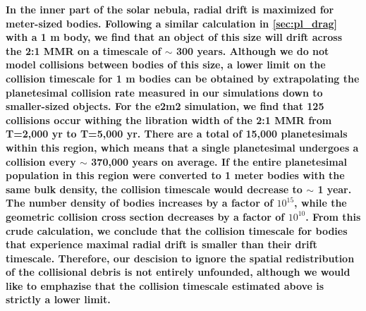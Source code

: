 \documentclass[fleqn,usenatbib]{mnras}
\begin{document}
\textbf{In the inner part of the solar nebula, radial drift is maximized for meter-sized bodies. Following a similar calculation in \ref{sec:pl_drag} with a 1 m body, we find that an object of this size will drift across the 2:1 MMR on a timescale of $\sim$ 300 years. Although we do not model collisions between bodies of this size, a lower limit on the collision timescale for 1 m bodies can be obtained by extrapolating the planetesimal collision rate measured in our simulations down to smaller-sized objects. For the e2m2 simulation, we find that 125 collisions occur withing the libration width of the 2:1 MMR from T=2,000 yr to  T=5,000 yr. There are a total of 15,000 planetesimals within this region, which means that a single planetesimal undergoes a collision every $\sim$ 370,000 years on average. If the entire planetesimal population in this region were converted to 1 meter bodies with the same bulk density, the collision timescale would decrease to $\sim$ 1 year. The number density of bodies increases by a factor of $10^{15}$, while the geometric collision cross section decreases by a factor of $10^{10}$. From this crude calculation, we conclude that the collision timescale for bodies that experience maximal radial drift is smaller than their drift timescale. Therefore, our descision to ignore the spatial redistribution of the collisional debris is not entirely unfounded, although we would like to emphazise that the collision timescale estimated above is strictly a lower limit.}
\end{document}
